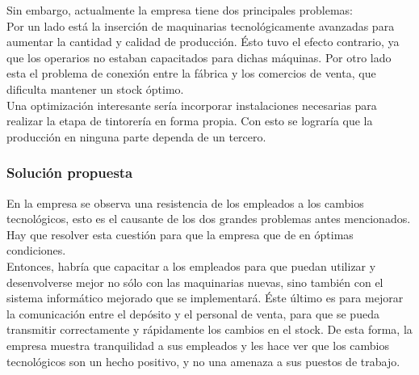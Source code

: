 \documentclass[a4paper,10pt,titlepage]{article}
\begin{document}
	Sin embargo, actualmente la empresa tiene dos principales problemas:\\
	
	Por un lado est\'a la inserci\'on de maquinarias tecnol\'ogicamente avanzadas para aumentar la cantidad y calidad de producci\'on. \'Esto tuvo el efecto contrario, ya que los operarios no estaban capacitados para dichas m\'aquinas. Por otro lado esta el problema de conexi\'on entre la f\'abrica y los comercios de venta, que dificulta mantener un stock \'optimo.\\
	
	Una optimizaci\'on interesante ser\'ia incorporar instalaciones necesarias para realizar la etapa de tintorer\'ia en forma propia. Con esto se lograr\'ia que la producci\'on en ninguna parte dependa de un tercero.


\subsubsection{Soluci\'on propuesta}
	En la empresa se observa una resistencia de los empleados a los cambios tecnol\'ogicos, esto es el causante de los dos grandes problemas antes mencionados. Hay que resolver esta cuesti\'on para que la empresa que de en \'optimas condiciones.\\

	Entonces, habr\'ia que capacitar a los empleados para que puedan utilizar y desenvolverse mejor no s\'olo con las maquinarias nuevas, sino tambi\'en con el sistema inform\'atico mejorado que se implementar\'a. \'Este \'ultimo es para mejorar la comunicaci\'on entre el dep\'osito y el personal de venta, para que se pueda transmitir correctamente y r\'apidamente los cambios en el stock. De esta forma, la empresa muestra tranquilidad a sus empleados y les hace ver que los cambios tecnol\'ogicos son un hecho positivo, y no una amenaza a sus puestos de trabajo. 
\end{document}
